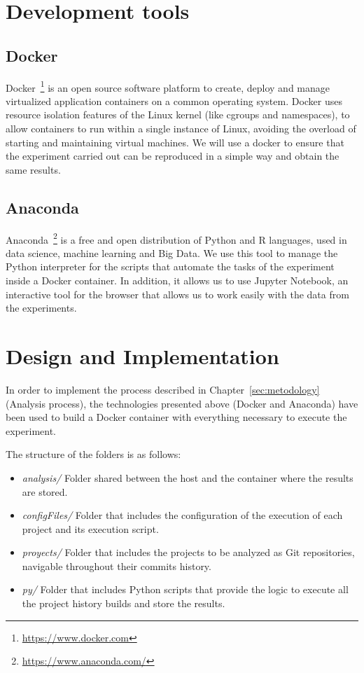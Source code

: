 \section{Development tools}

\subsection{Docker} 

Docker~\footnote{\url{https://www.docker.com}} is an open source software platform to create, deploy and manage virtualized application containers on a common operating system. Docker uses resource isolation features of the Linux kernel (like cgroups and namespaces), to allow containers to run within a single instance of Linux, avoiding the overload of starting and maintaining virtual machines. We will use a docker to ensure that the experiment carried out can be reproduced in a simple way and obtain the same results.

\subsection{Anaconda}

Anaconda~\footnote{\url{https://www.anaconda.com/}} is a free and open distribution of Python and R languages, used in data science, machine learning and Big Data. We use this tool to manage the Python interpreter for the scripts that automate the tasks of the experiment inside a Docker container. In addition, it allows us to use Jupyter Notebook, an interactive tool for the browser that allows us to work easily with the data from the experiments.

\section{Design and Implementation}

In order to implement the process described in Chapter~\ref{sec:metodology} (Analysis process), the technologies presented above (Docker and Anaconda) have been used to build a Docker container with everything necessary to execute the experiment. 

The structure of the folders is as follows:

\begin{itemize}
	\item \textit{analysis/} Folder shared between the host and the container where the results are stored.
	\item \textit{configFiles/} Folder that includes the configuration of the execution of each project and its execution script.
	\item \textit{proyects/} Folder that includes the projects to be analyzed as Git repositories, navigable throughout their commits history.
	\item \textit{py/} Folder that includes Python scripts that provide the logic to execute all the project history builds and store the results.
\end{itemize} 

